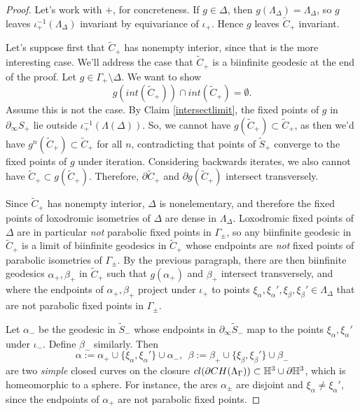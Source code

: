 \documentclass[12pt]{amsart}
\theoremstyle{definition}
\theoremstyle{remark}
\begin{document}
\begin{proof}
	Let's work with $+$, for concreteness. If $g \in \Delta$, then $g(\Lambda_\Delta)=\Lambda_\Delta$, so $g$ leaves $\iota_+^{-1}(\Lambda_\Delta)$ invariant by equivariance of $\iota_+$. Hence $g$ leaves $\tilde C_+$ invariant.
	
	Let's suppose first that $\tilde C_+$ has nonempty interior, since that is the more interesting case. We'll address the case that $\tilde C_+$ is a biinfinite geodesic at the end of the proof. Let $g\in \Gamma_+\setminus \Delta$.  We want to show $$g(int(\tilde C_+)) \cap int(\tilde C_+)=\emptyset.$$ Assume this is not the case. By Claim \ref{intersectlimit}, the fixed points of $g$ in $\partial_\infty S_+$ lie outside $\iota_+^{-1}(\Lambda(\Delta))$. So, we cannot have $g(\tilde C_+)\subset \tilde C_+$, as then we'd have $g^n(\tilde C_+)\subset \tilde C_+$ for all $n$, contradicting that points of $\tilde S_+$ converge to the fixed points of $g$ under iteration. Considering backwards iterates, we also cannot have $\tilde C_+ \subset g(\tilde C_+)$. Therefore, $\partial \tilde C_+$ and $\partial g(\tilde C_+)$ intersect transversely. 
	
	Since $\tilde C_+$ has nonempty interior, $\Delta$ is nonelementary, and therefore the fixed points of loxodromic isometries of $\Delta$ are dense in $\Lambda_\Delta$. Loxodromic fixed points of $\Delta$ are in particular \emph{not} parabolic fixed points in $\Gamma_\pm$, so any biinfinite geodesic in $\tilde C_+$ is a limit of biinfinite geodesics in $\tilde C_+$ whose endpoints are \emph{not} fixed points of parabolic isometries of $\Gamma_\pm$. By the previous paragraph, there are then  biinfinite geodesics $\alpha_+,\beta_+$ in $\tilde C_+$ such that $g(\alpha_+)$ and $\beta_+$ intersect transversely, and where the endpoints of $\alpha_+,\beta_+$ project under $\iota_+$ to points $\xi_\alpha,\xi_\alpha',\xi_\beta,\xi_\beta'\in \Lambda_\Delta$ that are not parabolic fixed points in $\Gamma_\pm$.
	
	Let $\alpha_-$ be the geodesic in $\tilde S_-$ whose endpoints in $\partial_\infty \tilde S_-$ map to the points $\xi_\alpha,\xi_\alpha'$ under  $\iota_-$.  Define $\beta_-$ similarly. Then
	$$\alpha:= \alpha_+ \cup \{\xi_\alpha,\xi_\alpha'\} \cup \alpha_-, \ \ \beta:= \beta_+ \cup \{\xi_\beta,\xi_\beta'\} \cup \beta_-$$
	are two \emph{simple} closed curves on the closure $cl(\partial CH(\Lambda_\Gamma))\subset \mathbb H^3 \cup \partial \mathbb H^3$, which is homeomorphic to a sphere. For instance, the arcs $\alpha_\pm$ are disjoint and $\xi_\alpha\neq \xi_\alpha'$, since the endpoints of $\alpha_+$ are not parabolic fixed points.
	

\end{proof}
\end{document}
